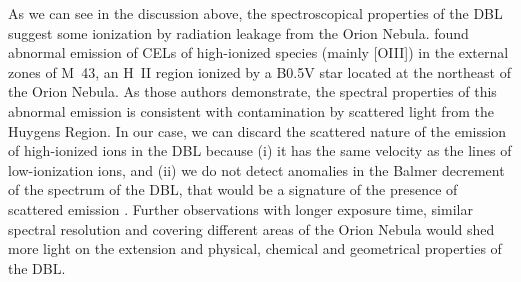\documentclass[twocolumn]{aastex63}
\newcommand{\eduardo}[1]{{\color{teal}E: #1}}
\begin{document}
As we can see in the discussion above, the spectroscopical properties of the DBL suggest some ionization by radiation leakage from the Orion Nebula. \citet{simondiaz11} found abnormal emission of CELs of high-ionized species (mainly [O\thinspace III]) in the external zones of M~43, an H~II region ionized by a B0.5V star located at the northeast of the Orion Nebula. As those authors demonstrate, the spectral properties of this abnormal emission is consistent with contamination by scattered light from the Huygens Region. In our case,  we can discard the scattered nature of the emission of high-ionized ions in the DBL because (i) it has the same velocity as the lines of low-ionization ions, and (ii) we do not detect anomalies in the Balmer decrement of the spectrum of the DBL, that would be a signature of the presence of scattered emission \citep[see][]{simondiaz11}. Further observations with longer exposure time, similar spectral resolution and covering different areas of the Orion Nebula would shed more light on the extension and physical, chemical and geometrical properties of the DBL.
\end{document}
